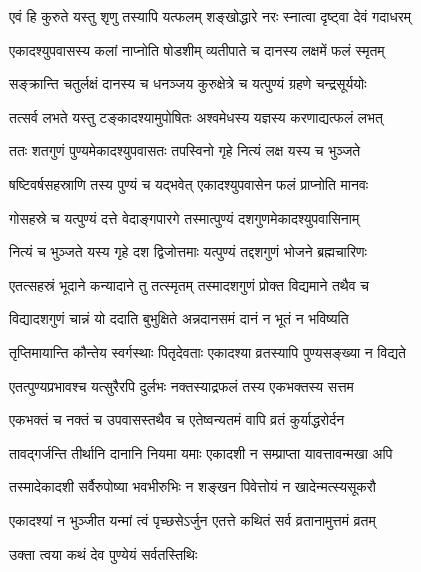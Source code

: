 \twolineshloka
{एवं हि कुरुते यस्तु शृणु तस्यापि यत्फलम्}
{शङ्खोद्धारे नरः स्नात्वा दृष्ट्वा देवं गदाधरम्} %

\twolineshloka
{एकादश्युपवासस्य कलां नाप्नोति षोडशीम्}
{व्यतीपाते च दानस्य लक्षमें फलं स्मृतम्} %

\twolineshloka
{सङ्क्रान्ति चतुर्लक्षं दानस्य च धनञ्जय}
{कुरुक्षेत्रे च यत्पुण्यं ग्रहणे चन्द्रसूर्ययोः} %

\twolineshloka
{तत्सर्व लभते यस्तु टङ्कादश्यामुपोषितः}
{अश्वमेधस्य यज्ञस्य करणाद्यत्फलं लभत्} %

\twolineshloka
{ततः शतगुणं पुण्यमेकादश्युपवासतः}
{तपस्विनो गृहे नित्यं लक्ष यस्य च भुञ्जते} %

\twolineshloka
{षष्टिवर्षसहस्राणि तस्य पुण्यं च यद्भवेत्}
{एकादश्युपवासेन फलं प्राप्नोति मानवः} %

\twolineshloka
{गोसहस्रे च यत्पुण्यं दत्ते वेदाङ्गपारगे}
{तस्मात्पुण्यं दशगुणमेकादश्युपवासिनाम्} %

\twolineshloka
{नित्यं च भुञ्जते यस्य गृहे दश द्विजोत्तमाः}
{यत्पुण्यं तद्दशगुणं भोजने ब्रह्मचारिणः} %

\twolineshloka
{एतत्सहस्रं भूदाने कन्यादाने तु तत्स्मृतम्}
{तस्मादशगुणं प्रोक्त विद्यमाने तथैव च} %

\twolineshloka
{विद्यादशगुणं चान्नं यो ददाति बुभुक्षिते}
{अन्नदानसमं दानं न भूतं न भविष्यति} %

\twolineshloka
{तृप्तिमायान्ति कौन्तेय स्वर्गस्थाः पितृदेवताः}
{एकादश्या व्रतस्यापि पुण्यसङ्ख्या न विद्यते} %

\twolineshloka
{एतत्पुण्यप्रभावश्च यत्सुरैरपि दुर्लभः}
{नक्तस्याद्रफलं तस्य एकभक्तस्य सत्तम} %

\twolineshloka
{एकभक्तं च नक्तं च उपवासस्तथैव च}
{एतेष्वन्यतमं वापि व्रतं कुर्याद्धरोर्दन} %

\twolineshloka
{तावद्गर्जन्ति तीर्थानि दानानि नियमा यमाः}
{एकादशी न सम्प्राप्ता यावत्तावन्मखा अपि} %

\twolineshloka
{तस्मादेकादशी सर्वैरुपोष्या भवभीरुभिः}
{न शङ्खन पिवेत्तोयं न खादेन्मत्स्यसूकरौ} %

\twolineshloka
{एकादश्यां न भुञ्जीत यन्मां त्वं पृच्छसेऽर्जुन}
{एतत्ते कथितं सर्व व्रतानामुत्तमं व्रतम्} %



\onelineshloka
{उक्ता त्वया कथं देव पुण्येयं सर्वतस्तिथिः} %


